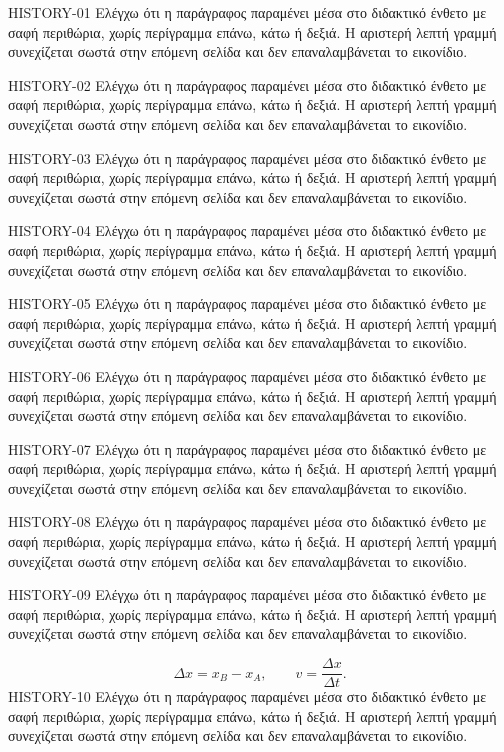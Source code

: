 \begin{HistoryBox}
HISTORY-01 Ελέγχω ότι η παράγραφος παραμένει μέσα στο διδακτικό ένθετο με σαφή περιθώρια, χωρίς περίγραμμα επάνω, κάτω ή δεξιά. Η αριστερή λεπτή γραμμή συνεχίζεται σωστά στην επόμενη σελίδα και δεν επαναλαμβάνεται το εικονίδιο.\par
HISTORY-02 Ελέγχω ότι η παράγραφος παραμένει μέσα στο διδακτικό ένθετο με σαφή περιθώρια, χωρίς περίγραμμα επάνω, κάτω ή δεξιά. Η αριστερή λεπτή γραμμή συνεχίζεται σωστά στην επόμενη σελίδα και δεν επαναλαμβάνεται το εικονίδιο.\par
HISTORY-03 Ελέγχω ότι η παράγραφος παραμένει μέσα στο διδακτικό ένθετο με σαφή περιθώρια, χωρίς περίγραμμα επάνω, κάτω ή δεξιά. Η αριστερή λεπτή γραμμή συνεχίζεται σωστά στην επόμενη σελίδα και δεν επαναλαμβάνεται το εικονίδιο.\par
HISTORY-04 Ελέγχω ότι η παράγραφος παραμένει μέσα στο διδακτικό ένθετο με σαφή περιθώρια, χωρίς περίγραμμα επάνω, κάτω ή δεξιά. Η αριστερή λεπτή γραμμή συνεχίζεται σωστά στην επόμενη σελίδα και δεν επαναλαμβάνεται το εικονίδιο.\par
HISTORY-05 Ελέγχω ότι η παράγραφος παραμένει μέσα στο διδακτικό ένθετο με σαφή περιθώρια, χωρίς περίγραμμα επάνω, κάτω ή δεξιά. Η αριστερή λεπτή γραμμή συνεχίζεται σωστά στην επόμενη σελίδα και δεν επαναλαμβάνεται το εικονίδιο.\par
HISTORY-06 Ελέγχω ότι η παράγραφος παραμένει μέσα στο διδακτικό ένθετο με σαφή περιθώρια, χωρίς περίγραμμα επάνω, κάτω ή δεξιά. Η αριστερή λεπτή γραμμή συνεχίζεται σωστά στην επόμενη σελίδα και δεν επαναλαμβάνεται το εικονίδιο.\par
HISTORY-07 Ελέγχω ότι η παράγραφος παραμένει μέσα στο διδακτικό ένθετο με σαφή περιθώρια, χωρίς περίγραμμα επάνω, κάτω ή δεξιά. Η αριστερή λεπτή γραμμή συνεχίζεται σωστά στην επόμενη σελίδα και δεν επαναλαμβάνεται το εικονίδιο.\par
HISTORY-08 Ελέγχω ότι η παράγραφος παραμένει μέσα στο διδακτικό ένθετο με σαφή περιθώρια, χωρίς περίγραμμα επάνω, κάτω ή δεξιά. Η αριστερή λεπτή γραμμή συνεχίζεται σωστά στην επόμενη σελίδα και δεν επαναλαμβάνεται το εικονίδιο.\par
HISTORY-09 Ελέγχω ότι η παράγραφος παραμένει μέσα στο διδακτικό ένθετο με σαφή περιθώρια, χωρίς περίγραμμα επάνω, κάτω ή δεξιά. Η αριστερή λεπτή γραμμή συνεχίζεται σωστά στην επόμενη σελίδα και δεν επαναλαμβάνεται το εικονίδιο.\par
\[\Delta x=x_B-x_A,\qquad v=\frac{\Delta x}{\Delta t}.\]
HISTORY-10 Ελέγχω ότι η παράγραφος παραμένει μέσα στο διδακτικό ένθετο με σαφή περιθώρια, χωρίς περίγραμμα επάνω, κάτω ή δεξιά. Η αριστερή λεπτή γραμμή συνεχίζεται σωστά στην επόμενη σελίδα και δεν επαναλαμβάνεται το εικονίδιο.\par

\end{HistoryBox}

